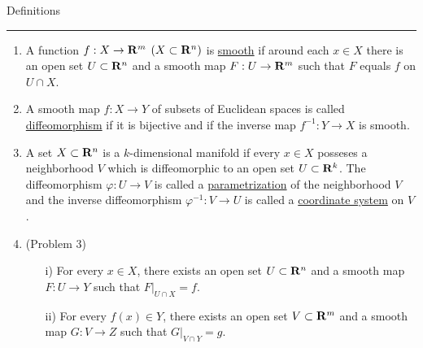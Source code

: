\begin{notes}
      Definitions
\end{notes}
\hrule

\begin{enumerate}
      \item A function $f:X\to\mathbf{R}^m$ $(X\subset\mathbf{R}^n)$ is \underline{smooth} if around each $x\in X$ there is an open set
            $U\subset\mathbf{R}^n$ and a smooth map $F:U\to\mathbf{R}^m$ such that $F$ equals $f$ on $U\cap X$.
      \item A smooth map $f:X\to Y$ of subsets of Euclidean spaces is called \underline{diffeomorphism} if it is bijective
            and if the inverse map $f^{-1}:Y\to X$ is smooth.
      \item A set $X\subset\mathbf{R}^n$ is a $k$-dimensional manifold if every $x\in X$ posseses a neighborhood $V$ which is
            diffeomorphic to an open set $U\subset\mathbf{R}^k$. The diffeomorphism $\varphi:U\to V$ is called a
            \underline{parametrization} of the neighborhood $V$ and the inverse diffeomorphism $\varphi^{-1}:V\to U$ is
            called a \underline{coordinate system} on $V$.
      \item (Problem 3)
            \begin{enumerate}
                  \item[i)] For every $x\in X$, there exists an open set $U\subset\mathbf{R}^n$ and a smooth map $F:U\to Y$ such that
                        $F|_{U\cap X}=f$.
                  \item[ii)] For every $f(x)\in Y$, there exists an open set $V\subset\mathbf{R}^m$ and a smooth map $G:V\to Z$ such that
                        $G|_{V\cap Y}=g$.
            \end{enumerate}
\end{enumerate}